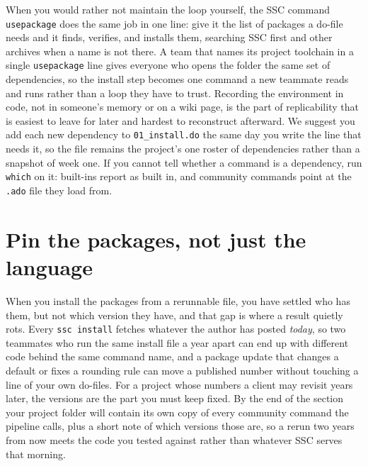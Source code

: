 \documentclass[
    a4paper,
    fontsize=10pt,
    twoside=true,
    numbers=noenddot,
]{kaobook}
\begin{document}
When you would rather not maintain the loop yourself, the SSC command \texttt{usepackage} \parencite{booth2011usepackage} does the same job in one line: give it the list of packages a do-file needs and it finds, verifies, and installs them, searching SSC first and other archives when a name is not there. A team that names its project toolchain in a single \texttt{usepackage} line gives everyone who opens the folder the same set of dependencies, so the install step becomes one command a new teammate reads and runs rather than a loop they have to trust. Recording the environment in code, not in someone's memory or on a wiki page, is the part of replicability that is easiest to leave for later and hardest to reconstruct afterward. We suggest you add each new dependency to \texttt{01\_install.do} the same day you write the line that needs it, so the file remains the project's one roster of dependencies rather than a snapshot of week one. If you cannot tell whether a command is a dependency, run \texttt{which} on it: built-ins report as built in, and community commands point at the \texttt{.ado} file they load from.

\section{Pin the packages, not just the language}\label{sec:ch02-pinning}
When you install the packages from a rerunnable file, you have settled who has them, but not which version they have, and that gap is where a result quietly rots. Every \texttt{ssc install} fetches whatever the author has posted \emph{today}, so two teammates who run the same install file a year apart can end up with different code behind the same command name, and a package update that changes a default or fixes a rounding rule can move a published number without touching a line of your own do-files. For a project whose numbers a client may revisit years later, the versions are the part you must keep fixed. By the end of the section your project folder will contain its own copy of every community command the pipeline calls, plus a short note of which versions those are, so a rerun two years from now meets the code you tested against rather than whatever SSC serves that morning.
\end{document}
